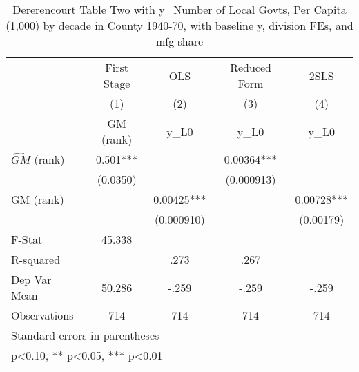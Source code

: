 \begin{table}[htbp]\centering
\def\sym#1{\ifmmode^{#1}\else\(^{#1}\)\fi}
\caption{Dererencourt Table Two with y=Number of Local Govts, Per Capita (1,000) by decade in County 1940-70, with baseline y, division FEs, and mfg share}
\begin{tabular}{l*{4}{c}}
\toprule
                    & First Stage   &         OLS   &Reduced Form   &        2SLS   \\
                    &\multicolumn{1}{c}{(1)}&\multicolumn{1}{c}{(2)}&\multicolumn{1}{c}{(3)}&\multicolumn{1}{c}{(4)}\\
                    &\multicolumn{1}{c}{GM  (rank)}&\multicolumn{1}{c}{y\_L0}&\multicolumn{1}{c}{y\_L0}&\multicolumn{1}{c}{y\_L0}\\
\midrule
$\hat{GM}$ (rank)   &       0.501***&               &     0.00364***&               \\
                    &    (0.0350)   &               &  (0.000913)   &               \\
\addlinespace
GM  (rank)          &               &     0.00425***&               &     0.00728***\\
                    &               &  (0.000910)   &               &   (0.00179)   \\
\midrule
F-Stat              &      45.338   &               &               &               \\
R-squared           &               &        .273   &        .267   &               \\
Dep Var Mean        &      50.286   &       -.259   &       -.259   &       -.259   \\
Observations        &         714   &         714   &         714   &         714   \\
\bottomrule
\multicolumn{5}{l}{\footnotesize Standard errors in parentheses}\\
\multicolumn{5}{l}{\footnotesize * p<0.10, ** p<0.05, *** p<0.01}\\
\end{tabular}
\end{table}
